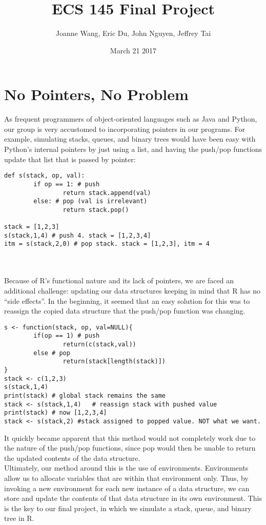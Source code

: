 \documentclass{article}
\title{ECS 145 Final Project}
\author{Joanne Wang, Eric Du, John Nguyen, Jeffrey Tai }
\date{March 21 2017}
\begin{document}
\maketitle

\section{No Pointers, No Problem}
As frequent programmers of object-oriented languages such as Java and Python, our group is very accustomed to incorporating pointers in our programs. For example, simulating stacks, queues, and binary trees would have been easy with Python’s internal pointers by just using a list, and having the push/pop functions update that list that is passed by pointer:

\begin{lstlisting}
def s(stack, op, val):
	    if op == 1: # push
		        return stack.append(val)
	    else: # pop (val is irrelevant)
		        return stack.pop()

stack = [1,2,3]
s(stack,1,4) # push 4. stack = [1,2,3,4]
itm = s(stack,2,0) # pop stack. stack = [1,2,3], itm = 4
\end{lstlisting}
\\\\Because of R's functional nature and its lack of pointers, we are faced an additional challenge: updating our data structures keeping in mind that R has no ``side effects''. In the beginning, it seemed that an easy solution for this was to reassign the copied data structure that the push/pop function was changing. 

\begin{lstlisting}
s <- function(stack, op, val=NULL){
	    if(op == 1) # push
		        return(c(stack,val))
	    else # pop
		        return(stack[length(stack)])
}
stack <- c(1,2,3)	
s(stack,1,4)
print(stack) # global stack remains the same
stack <- s(stack,1,4)	# reassign stack with pushed value
print(stack) # now [1,2,3,4]
stack <- s(stack,2) #stack assigned to popped value. NOT what we want.

\end{lstlisting}
It quickly became apparent that this method would not completely work due to the nature of the push/pop functions, since pop would then be unable to return the updated contents of the data structure. 
\\Ultimately, our method around this is the use of environments. Environments allow us to allocate variables that are within that environment only. Thus, by invoking a new environment for each new instance of a data structure, we can store and update the contents of that data structure in its own environment. This is the key to our final project, in which we simulate a stack, queue, and binary tree in R.
\end{document}
